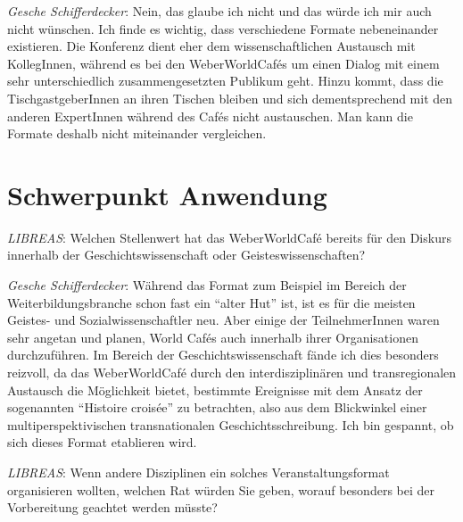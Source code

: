 \documentclass[a4paper,
fontsize=11pt,
oneside,
numbers=noperiodatend,
parskip=half-,
bibliography=totoc,
final
]{scrartcl}
\begin{document}
\emph{Gesche Schifferdecker}: Nein, das glaube ich nicht und das würde
ich mir auch nicht wünschen. Ich finde es wichtig, dass verschiedene
Formate nebeneinander existieren. Die Konferenz dient eher dem
wissenschaftlichen Austausch mit KollegInnen, während es bei den
WeberWorldCafés um einen Dialog mit einem sehr unterschiedlich
zusammengesetzten Publikum geht. Hinzu kommt, dass die
TischgastgeberInnen an ihren Tischen bleiben und sich dementsprechend
mit den anderen ExpertInnen während des Cafés nicht austauschen. Man
kann die Formate deshalb nicht miteinander vergleichen.

\section*{Schwerpunkt Anwendung}\label{schwerpunkt-anwendung}

\emph{LIBREAS}: Welchen Stellenwert hat das WeberWorldCafé bereits für
den Diskurs innerhalb der Geschichtswissenschaft oder
Geisteswissenschaften?

\emph{Gesche Schifferdecker}: Während das Format zum Beispiel im Bereich
der Weiterbildungsbranche schon fast ein \enquote{alter Hut} ist, ist es
für die meisten Geistes- und Sozialwissenschaftler neu. Aber einige der
TeilnehmerInnen waren sehr angetan und planen, World Cafés auch
innerhalb ihrer Organisationen durchzuführen. Im Bereich der
Geschichtswissenschaft fände ich dies besonders reizvoll, da das
WeberWorldCafé durch den interdisziplinären und transregionalen
Austausch die Möglichkeit bietet, bestimmte Ereignisse mit dem Ansatz
der sogenannten \enquote{Histoire croisée} zu betrachten, also aus dem
Blickwinkel einer multiperspektivischen transnationalen
Geschichtsschreibung. Ich bin gespannt, ob sich dieses Format etablieren
wird.

\emph{LIBREAS}: Wenn andere Disziplinen ein solches Veranstaltungsformat
organisieren wollten, welchen Rat würden Sie geben, worauf besonders bei
der Vorbereitung geachtet werden müsste?
\end{document}
